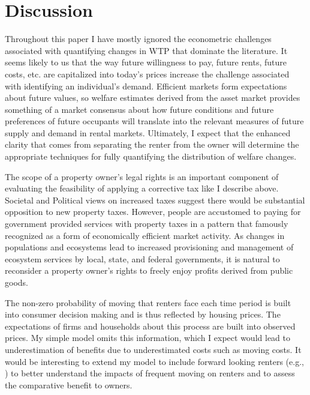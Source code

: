 \documentclass[ecta,nameyear,draft]{econsocart}
\theoremstyle{plain}
\theoremstyle{remark}
\begin{document}
\section{Discussion}
Throughout this paper I have mostly ignored the econometric challenges associated with quantifying changes in WTP that dominate the literature. It seems likely to us that the way future willingness to pay, future rents, future costs, etc. are capitalized into today's prices increase the challenge associated with identifying an individual's demand. Efficient markets form expectations about future values, so welfare estimates derived from the asset market provides something of a market consensus about how future conditions and future preferences of future occupants will translate into the relevant measures of future supply and demand in rental markets. Ultimately, I expect that the enhanced clarity that comes from separating the renter from the owner will  determine the appropriate techniques for fully quantifying the distribution of welfare changes.

The scope of a property owner's legal rights is an important component of evaluating the feasibility of applying a corrective tax like I describe above. Societal and Political views on increased taxes suggest there would be substantial opposition to new property taxes. However, people are accustomed to paying for government provided services with property taxes in a pattern that \cite{tiebout56} famously recognized as a form of economically efficient market activity. As changes in populations and ecosystems lead to increased provisioning and management of ecosystem services by local, state, and federal governments, it is natural to reconsider a property owner's rights to freely enjoy profits derived from public goods.

The non-zero probability of moving that renters face each time period is built into consumer decision making and is thus reflected by housing prices. The expectations of firms and households about this process are built into observed prices. My simple model omits this information, which I expect would lead to underestimation of benefits due to underestimated costs such as moving costs. It would be interesting to extend my model to include forward looking renters (e.g., \cite{bishop19}) to better understand the impacts of frequent moving on renters and to assess the comparative benefit to owners.  
\end{document}
